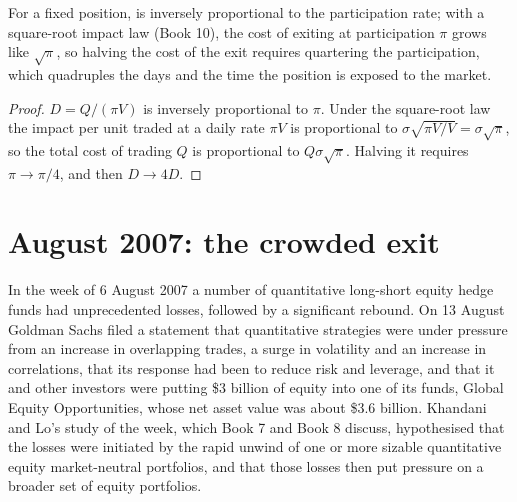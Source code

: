 \begin{proposition}\label{prop:fm:case-studies-i:days}
For a fixed position,  is inversely proportional to the participation rate; with a square-root impact law (Book 10), the cost of
exiting at participation $\pi$ grows like $\sqrt\pi$, so halving the cost of the exit requires quartering the participation, which quadruples the days
and the time the position is exposed to the market.
\end{proposition}

\begin{proof}
$D=Q/(\pi V)$ is inversely proportional to $\pi$. Under the square-root law the impact per unit traded at a daily rate $\pi V$ is proportional to
$\sigma\sqrt{\pi V/V}=\sigma\sqrt\pi$, so the total cost of trading $Q$ is proportional to $Q\sigma\sqrt\pi$. Halving it requires $\pi\to\pi/4$, and
then $D\to4D$.
\end{proof}

\section{August 2007: the crowded exit}

In the week of 6 August 2007 a number of quantitative long-short equity hedge funds had unprecedented losses, followed by a significant rebound. On 13
August Goldman Sachs filed a statement that quantitative strategies were under pressure from an increase in overlapping trades, a surge in volatility and an increase in correlations, that its response had been to reduce risk and leverage, and that it and
other investors were putting \$3 billion of equity into one of its funds, Global Equity Opportunities, whose net asset value was about \$3.6 billion.
Khandani and Lo's study of the week, which Book 7 and Book 8 discuss, hypothesised that the losses were initiated by the rapid unwind of one or more
sizable quantitative equity market-neutral portfolios, and that those losses then put pressure on a broader set of equity portfolios.

